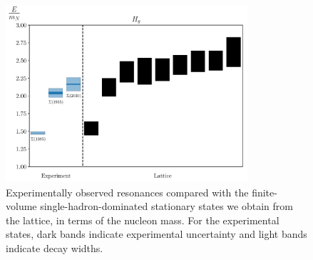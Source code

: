 \begin{figure}[H]
    \centering
    \hspace*{-1cm}\includegraphics[width=0.8\textwidth]{figures/sigmas/hg/expvslat.pdf}
    \caption[Experimentally observed resonances compared with the finite-volume single-hadron-dominated stationary states we obtain from the lattice in $H_g$, in terms of the nucleon mass.]{Experimentally observed resonances compared with the finite-volume single-hadron-dominated stationary states we obtain from the lattice, in terms of the nucleon mass. For the experimental states, dark bands indicate experimental uncertainty and light bands indicate decay widths.}\label{fig:hg_exp}
\end{figure}

